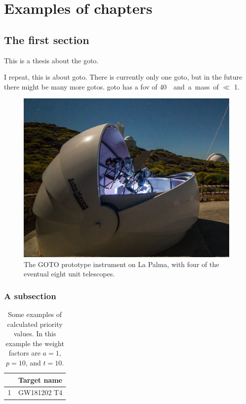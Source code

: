 \chapter{Examples of chapters}
\label{chap:examples}
\chaptoc{}
\newpage

\section{The first section}
\label{sec:section1}

This is a thesis about the \gls{goto}.

I repeat, this is about \gls{goto}. There is currently only one \gls{goto}, but in the future there might be many more \gls{goto}s. \gls{goto} has a \gls{fov} of \about\SI{40}{\square\deg} and a mass of $\ll$ \SI{1}{\solarmass}.


\begin{figure}[htb]
\begin{center}
\includegraphics[width=11cm]{images/goto_photo.jpg}
\end{center}
\label{fig:goto_photo}
\caption[The GOTO prototype instrument]{The GOTO prototype instrument on La Palma, with four of the eventual eight unit telescopes.}
\end{figure}


\lipsum[1-2] %

\subsection{A subsection}

\begin{table}[b]
\begin{center}
\begin{tabular}{c l}
~& \textbf{Target name} \\
\midrule
1 & GW181202 T4 \\
\end{tabular}
\end{center}
\label{tab:priority}
\caption[Some examples of calculated priority values]{Some examples of calculated priority values. In this example the weight factors are $a=1$, $p=10$, and $t=10$.}
\end{table}

